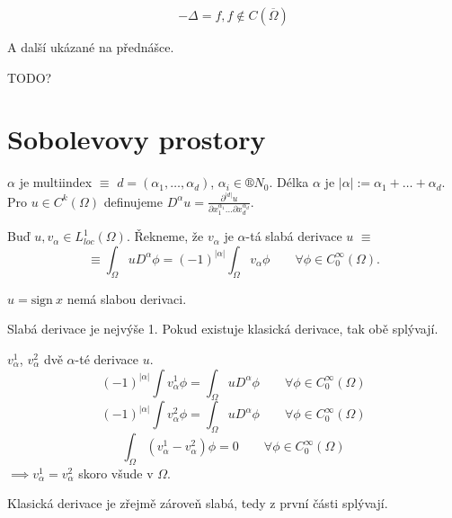 \documentclass[12pt]{article}					%
\begin{document}
\begin{poznamka}
	$$ - \Delta = f, f \notin C(\overline{\Omega}) $$

	A další ukázané na přednášce.
\end{poznamka}

TODO?


\section{Sobolevovy prostory}
\begin{definice}[Multiindex]
	$\alpha$ je multiindex $≡$ $d = (\alpha_1, …, \alpha_d)$, $\alpha_i \in ®N_0$. Délka $\alpha$ je $|\alpha| := \alpha_1 + … + \alpha_d$. Pro $u \in C^k(\Omega)$ definujeme $D^\alpha u = \frac{\partial^{|d|} u}{\partial x_1^{\alpha_1} … \partial x_d^{\alpha_d}}$.
\end{definice}

\begin{definice}
	Buď $u, v_\alpha \in L^1_{loc}(\Omega)$. Řekneme, že $v_\alpha$ je $\alpha$-tá slabá derivace $u$ $≡$
	$$ ≡ \int_\Omega u D^\alpha \phi = (-1)^{|\alpha|} \int_\Omega v_\alpha \phi \qquad \forall \phi \in C_0^∞(\Omega). $$
\end{definice}

\begin{priklad}
	$u = \mathrm{sign}\ x$ nemá slabou derivaci.
\end{priklad}

\begin{lemma}[O smysluplnosti]
	Slabá derivace je nejvýše 1. Pokud existuje klasická derivace, tak obě splývají.

	\begin{dukazin}
		$v_\alpha^1$, $v_\alpha^2$ dvě $\alpha$-té derivace $u$.
		$$ (-1)^{|\alpha|} \int v_\alpha^1 \phi = \int_\Omega u D^\alpha \phi \qquad \forall \phi \in C_0^∞(\Omega) $$
		$$ (-1)^{|\alpha|} \int v_\alpha^2 \phi = \int_\Omega u D^\alpha \phi \qquad \forall \phi \in C_0^∞(\Omega) $$
		$$ \int_\Omega (v_\alpha^1 - v_\alpha^2) \phi = 0 \qquad \forall \phi \in C_0^∞(\Omega) $$
		$\implies v_\alpha^1 = v_\alpha^2$ skoro všude v $\Omega$.

		Klasická derivace je zřejmě zároveň slabá, tedy z první části splývají.
	\end{dukazin}
\end{lemma}
\end{document}
